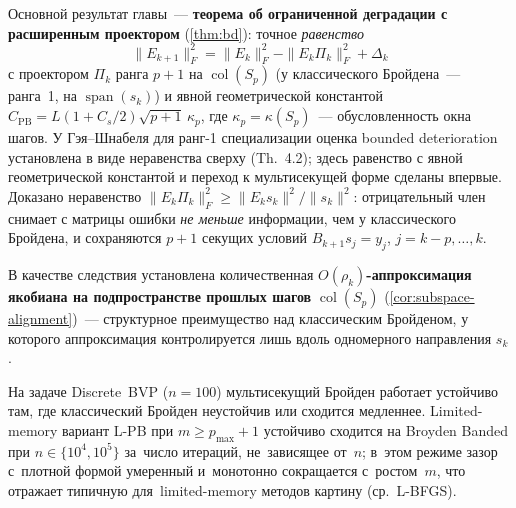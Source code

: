 Основной результат главы~--- \textbf{теорема об ограниченной деградации
с расширенным проектором} (\ref{thm:bd}): точное \emph{равенство}
\[
  \|E_{k+1}\|_F^2 = \|E_k\|_F^2 - \|E_k \Pi_k\|_F^2 + \Delta_k
\]
с проектором $\Pi_k$ ранга $p{+}1$ на $\operatorname{col}(S_p)$
(у классического Бройдена~--- ранга~1, на $\operatorname{span}(s_k)$)
и явной геометрической константой
$C_{\mathrm{PB}} = L(1+C_s/2)\sqrt{p+1}\,\kappa_p$, где
$\kappa_p = \kappa(S_p)$~--- обусловленность окна шагов.
У Гэя--Шнабеля для ранг-1 специализации
оценка bounded deterioration установлена в виде неравенства сверху
(Th.~4.2); здесь равенство с явной геометрической константой и
переход к мультисекущей форме сделаны впервые.
Доказано неравенство
$\|E_k\Pi_k\|_F^2 \ge \|E_k s_k\|^2/\|s_k\|^2$: отрицательный член
снимает с матрицы ошибки \emph{не меньше} информации, чем у
классического Бройдена, и сохраняются $p{+}1$ секущих условий
$B_{k+1} s_j = y_j$, $j = k{-}p, \ldots, k$.

В качестве следствия установлена количественная
\textbf{$O(\rho_k)$-аппроксимация якобиана на подпространстве прошлых
шагов} $\operatorname{col}(S_p)$ (\ref{cor:subspace-alignment})~---
структурное преимущество над классическим Бройденом, у которого
аппроксимация контролируется лишь вдоль одномерного направления $s_k$.

На задаче Discrete~BVP ($n{=}100$) мультисекущий Бройден работает
устойчиво там, где классический Бройден неустойчив или сходится
медленнее. Limited-memory вариант L-PB при $m\ge p_{\max}+1$
устойчиво сходится на Broyden Banded при $n\in\{10^4, 10^5\}$ за~число
итераций, не~зависящее от~$n$; в~этом режиме зазор с~плотной формой
умеренный и~монотонно сокращается с~ростом~$m$, что отражает типичную
для~limited-memory методов картину (ср.\ L-BFGS).

